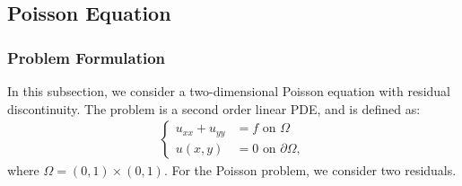 \begin{figure}
\label{subfig:0.5_predictions}
\label{fig:pinn_advection}
\end{figure}


\subsection{Poisson Equation}
\subsubsection{Problem Formulation}
In this subsection, we consider a two-dimensional Poisson equation with residual discontinuity. The problem is a second order linear PDE, and is defined as:
\begin{align}\label{eq:poisson}
\begin{cases}
    u_{xx}+u_{yy} &= f \text{ on } \Omega \\
    u(x,y) &= 0 \text{ on } \partial\Omega,
\end{cases}
\end{align}
where $\Omega = (0,1) \times (0,1)$. For the Poisson problem, we consider two residuals. 
